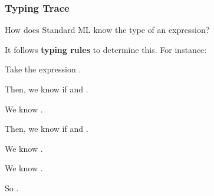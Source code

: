 \documentclass[aspectratio=169]{beamer}
\begin{document}
\begin{frame}[plain]
  \frametitle{Typing Trace}

  How does Standard ML know the type of an expression?

  \vspace{5pt}

  It follows \textbf{typing rules} to determine this. For instance: 

  \pause
  \vspace{\fill}
  

  \pause
  \vspace{\fill}

  Take the expression .

  \pause
  \vspace{\fill}

  Then, we know  if  and .
  \pause
  \vspace{3pt}

  We know .
  \pause
  \vspace{3pt}

  Then, we know  if  and .
  \pause
  \vspace{3pt}

  We know .
  \pause
  \vspace{3pt}

  We know .
  \pause
  \vspace{3pt}

  So .
\end{frame}
\end{document}
